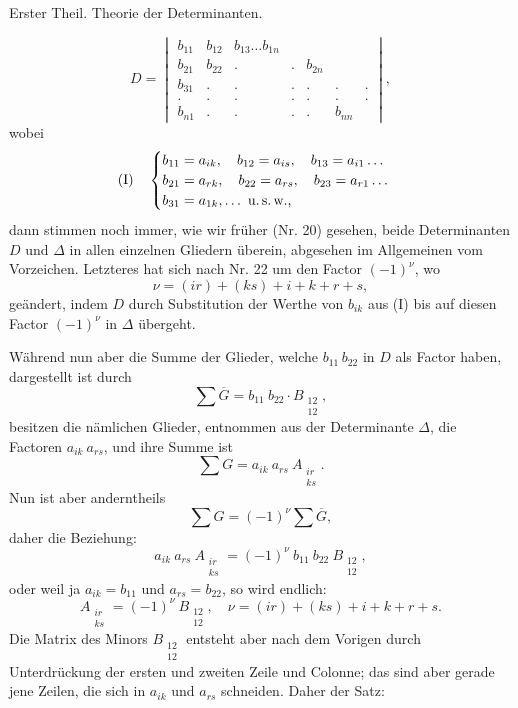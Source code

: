 \documentclass[11pt]{article}
\providecommand{\weberpage}[1]{}
\providecommand{\weq}[2]{\begin{equation}\tag{#1}#2\end{equation}}
\begin{document}
\weberpage{52}
Erster Theil. Theorie der Determinanten.

\[
D = \begin{vmatrix} b_{11} & b_{12} & b_{13} \ldots b_{1n}\\ b_{21} & b_{22} & . & . & b_{2n}\\ b_{31} & . & . & . & . & . & .\\ . & . & . & . & . & . & .\\ b_{n1} & . & . & . & . & b_{nn} \end{vmatrix},
\]
wobei
\[
\text{(I)}\quad
\begin{cases}
b_{11} = a_{ik},\quad b_{12} = a_{is},\quad b_{13} = a_{i1}\ldots\\
b_{21} = a_{rk},\quad b_{22} = a_{rs},\quad b_{23} = a_{r1}\ldots\\
b_{31} = a_{1k},\ldots\ \text{u.\,s.\,w.,}
\end{cases}
\]
dann stimmen noch immer, wie wir früher (Nr. 20) gesehen, beide Determinanten $D$ und $\varDelta$ in allen einzelnen Gliedern überein, abgesehen im Allgemeinen vom Vorzeichen. Letzteres hat sich nach Nr. 22 um den Factor $(-1)^\nu$, wo
\[
\nu = (ir) + (ks) + i + k + r + s,
\]
geändert, indem $D$ durch Substitution der Werthe von $b_{ik}$ aus (I) bis auf diesen Factor $(-1)^\nu$ in $\varDelta$ übergeht.

Während nun aber die Summe der Glieder, welche $b_{11}\,b_{22}$ in $D$ als Factor haben, dargestellt ist durch
\weq{1}{\sum \overline{G} = b_{11}\ b_{22} \cdot B_{\substack{12\\12}},}
besitzen die nämlichen Glieder, entnommen aus der Determinante $\varDelta$, die Factoren $a_{ik}\ a_{rs}$, und ihre Summe ist
\weq{2}{\sum G = a_{ik}\ a_{rs}\ A_{\substack{ir\\ks}}.}
Nun ist aber anderntheils
\[
\sum G = (-1)^\nu \sum \overline{G},
\]
daher die Beziehung:
\[
a_{ik}\ a_{rs}\ A_{\substack{ir\\ks}} = (-1)^\nu\ b_{11}\ b_{22}\ B_{\substack{12\\12}},
\]
oder weil ja $a_{ik} = b_{11}$ und $a_{rs} = b_{22}$, so wird endlich:
\weq{3}{A_{\substack{ir\\ks}} = (-1)^\nu\ B_{\substack{12\\12}}, \quad \nu = (ir) + (ks) + i + k + r + s.}
Die Matrix des Minors $B_{\substack{12\\12}}$ entsteht aber nach dem Vorigen durch Unterdrückung der ersten und zweiten Zeile und Colonne; das sind aber gerade jene Zeilen, die sich in $a_{ik}$ und $a_{rs}$ schneiden. Daher der Satz:
\end{document}
